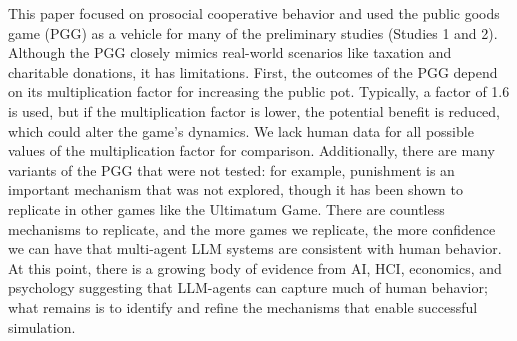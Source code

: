 This paper focused on prosocial cooperative behavior and used the public goods game (PGG) as a vehicle for many of the preliminary studies (Studies 1 and 2). Although the PGG closely mimics real-world scenarios like taxation and charitable donations, it has limitations. First, the outcomes of the PGG depend on its multiplication factor for increasing the public pot. Typically, a factor of 1.6 is used, but if the multiplication factor is lower, the potential benefit is reduced, which could alter the game's dynamics. We lack human data for all possible values of the multiplication factor for comparison. Additionally, there are many variants of the PGG that were not tested: for example, punishment is an important mechanism that was not explored, though it has been shown to replicate in other games like the Ultimatum Game. There are countless mechanisms to replicate, and the more games we replicate, the more confidence we can have that multi-agent LLM systems are consistent with human behavior. At this point, there is a growing body of evidence from AI, HCI, economics, and psychology suggesting that LLM-agents can capture much of human behavior; what remains is to identify and refine the mechanisms that enable successful simulation.

